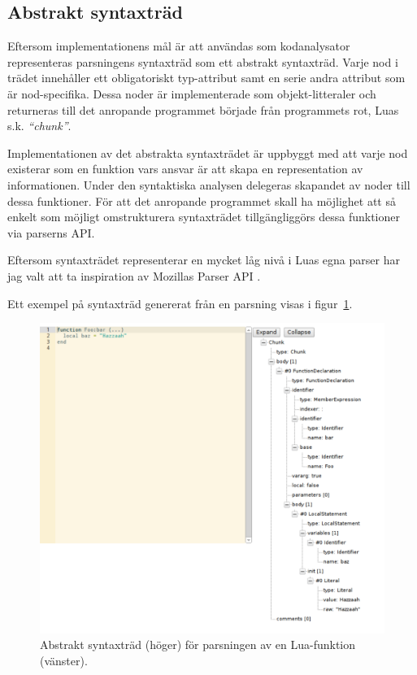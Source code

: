 \subsection{Abstrakt syntaxträd}

Eftersom implementationens mål är att användas som kodanalysator representeras
parsningens syntaxträd som ett abstrakt syntaxträd. Varje nod i trädet
innehåller ett obligatoriskt typ-attribut samt en serie andra attribut som är
nod-specifika. Dessa noder är implementerade som objekt-litteraler och
returneras till det anropande programmet började från programmets rot, Luas
s.k. \textit{``chunk''}.

Implementationen av det abstrakta syntaxträdet är uppbyggt med att varje nod
existerar som en funktion vars ansvar är att skapa en representation av
informationen. Under den syntaktiska analysen delegeras skapandet av noder
till dessa funktioner. För att det anropande programmet skall ha möjlighet att
så enkelt som möjligt omstrukturera syntaxträdet tillgängliggörs dessa
funktioner via parserns API.

Eftersom syntaxträdet representerar en mycket låg nivå i Luas egna parser har
jag valt att ta inspiration av Mozillas Parser API \citep{parserapi}.

Ett exempel på syntaxträd genererat från en parsning visas i
figur~\ref{fig:tool}.

\begin{figure}[ht]
  \includegraphics[width=\textwidth]{figures/pdf/tool.pdf}
  \caption{Abstrakt syntaxträd (höger) för parsningen av en Lua-funktion
  (vänster).}
  \label{fig:tool}
\end{figure}

